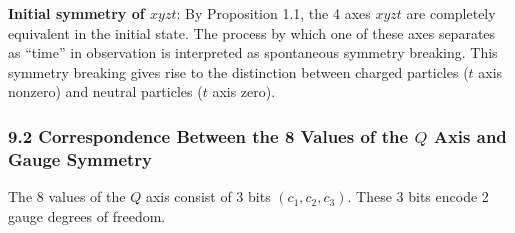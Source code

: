 \documentclass[
  a4paper,11pt]{article}
\theoremstyle{definition}
\theoremstyle{remark}
\begin{document}
\textbf{Initial symmetry of \(xyzt\)}: By Proposition 1.1, the 4 axes
\(xyzt\) are completely equivalent in the initial state. The process by
which one of these axes separates as ``time'' in observation is
interpreted as spontaneous symmetry breaking. This symmetry breaking
gives rise to the distinction between charged particles (\(t\) axis
nonzero) and neutral particles (\(t\) axis zero).

\subsubsection{\texorpdfstring{9.2 Correspondence Between the 8 Values
of the \(Q\) Axis and Gauge
Symmetry}{9.2 Correspondence Between the 8 Values of the Q Axis and Gauge Symmetry}}\label{correspondence-between-the-8-values-of-the-q-axis-and-gauge-symmetry}

The 8 values of the \(Q\) axis consist of 3 bits \((c_1, c_2, c_3)\).
These 3 bits encode 2 gauge degrees of freedom.
\end{document}
